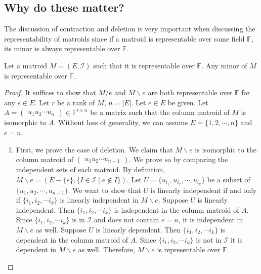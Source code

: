 \subsection{Why do these matter?}
The discussion of contraction and deletion is very important when discussing the representability of matroids since if a matroid is representable over some field $\mathbb{F}$, its minor is always representable over $\mathbb{F}$.

\begin{thm}
Let a matroid $M = (E, \mathcal{I})$ such that it is representable over $\mathbb{F}$.
Any minor of $M$ is representable over $\mathbb{F}$.
\end{thm}

\begin{proof}
It suffices to show that $M / e$ and $M \backslash e$ are both representable over $\mathbb{F}$ for any $e \in E$.
Let $r$ be a rank of $M$, $n = \lvert E \rvert$.
Let $e \in E$ be given.
Let $A = \begin{pmatrix}u_1 u_2 \cdots u_n\end{pmatrix} \in \mathbb{F}^{r \times n}$ be a matrix such that the column matroid of $M$ is isomorphic to $A$.
Without loss of generality, we can assume $E = \{ 1, 2, \cdots, n \}$ and $e = n$.
\begin{enumerate}
\item 
  First, we prove the case of deletion.
  We claim that $M \backslash e$ is isomorphic to the column matroid of $\begin{pmatrix} u_1 u_2 \cdots u_{n-1} \end{pmatrix}$.
  We prove so by comparing the independent sets of each matroid.
  By definition, $M \backslash e = (E - \{ e \}, \{ I \in \mathcal{I} \mid e \notin I \})$.
  Let $U = \{ u_{i_1}, u_{i_2}, \cdots, u_{i_k} \}$ be a subset of $\{ u_1, u_2, \cdots, u_{n-1} \}$.
  We want to show that $U$ is linearly independent if and only if $\{ i_1, i_2, \cdots i_k \}$ is linearly independent in $M \backslash e$.
  Suppose $U$ is linearly independent. 
  Then $\{ i_1, i_2, \cdots i_k \}$ is independent in the column matroid of $A$.
  Since $\{ i_1, i_2, \cdots i_k \}$ is in $\mathcal{I}$ and does not contain $e = n$, it is independent in $M \backslash e$ as well.
  Suppose $U$ is linearly dependent. 
  Then $\{ i_1, i_2, \cdots i_k \}$ is dependent in the column matroid of $A$.
  Since $\{ i_1, i_2, \cdots i_k \}$ is not in $\mathcal{I}$ it is dependent in $M \backslash e$ as well.
  Therefore, $M \backslash e$ is representable over $\mathbb{F}$.

\end{enumerate}
\end{proof}

